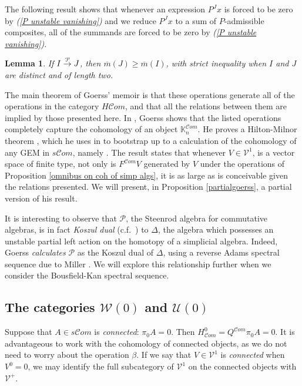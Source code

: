 \documentclass[11pt]{amsart} \renewcommand{\baselinestretch}{1.4}
\theoremstyle{plain}
\newtheorem{lem}[thm]{Lemma}
\theoremstyle{definition}
\newcommand{\scrC}{\mathscr{C}}
\newcommand{\calU}{\mathcal{U}}
\newcommand{\calP}{\mathcal{P}}
\newcommand{\calV}{\mathcal{V}}
\newcommand{\calw}{\mathcal{W}}
\newcommand{\citeBOX}[2][]{\cite[\mbox{#1}]{#2}}
\newcommand{\Palg}{{\calP}}
\newcommand{\deltaalg}{\Delta} %
\newcommand{\vect}[2]{\calV^{#1}_{#2}}
\newcommand{\HA}[1]{H#1}
\newcommand{\minDimP}{\overline{m}}
\newcommand{\produces}[3]{#3:#1\sim #2}
\renewcommand{\produces}[3]{#1\rightarrow_{#3} #2}%
\renewcommand{\produces}[3]{#1\overset{\smash{#3}}{\rightarrow} #2}%
\newcommand{\algs}{{\scrC\!\textit{om}}}
\begin{document}
\begin{Constructing cohomology operations}
The following result shows that whenever an expression $P^Jx$ is forced to be zero by \emph{(\ref{P unstable vanishing})}  and we reduce $P^Jx$ to a sum of $P$-admissible composites, all of the summands are forced to be zero by \emph{(\ref{P unstable vanishing})}.
\begin{lem}
\label{lemOnAdemChangeInMP}
If $\produces{I}{J}{\Palg}$, then $\minDimP(J) \geq \minDimP(I)$, with strict inequality when $I$ and $J$ are distinct and of length two.
\end{lem}
The main theorem of Goerss' memoir is that these operations generate all of the operations in the category $\HA{\algs}$, and that all  the relations between them  are implied by those presented here. In \cite[Chapter V]{MR1089001}, Goerss shows that the listed operations completely capture the cohomology of an object $\mathbb{K}_n^{\algs}$. He proves a Hilton-Milnor theorem \cite{GoerssHiltonMilnor.pdf}, which he uses in \citeBOX[\S11]{MR1089001} to bootstrap up to a calculation of the cohomology of any GEM in $s\algs$, namely \cite[Theorem I]{MR1089001}. The result states that whenever $V\in \vect{1}{}$,  is a  vector space of finite type, not only is 
$F^{\algs}V$
generated by $V$ under the operations of Proposition \ref{omnibus on coh of simp algs}, it is as large as is conceivable given the relations presented. We will present, in Proposition \ref{partialgoerss}, a partial version of his result.

It is  interesting to observe that $\Palg$, the Steenrod algebra for commutative algebras, is
in fact \emph{Koszul dual} (c.f.\ \cite{PriddyKoszul.pdf}) to $\deltaalg$, the algebra which possesses an unstable partial left action on the homotopy of a simplicial algebra. Indeed, Goerss \emph{calculates} $\Palg$ as the Koszul dual of $\deltaalg$, using a reverse Adams spectral sequence due to Miller \cite{MillerSullivanConjecture.pdf}. We will explore this relationship further when we consider the Bousfield-Kan spectral sequence.

\subsection{The categories $\calw(0)$ and $\calU(0)$}
Suppose that $A\in s\algs$ is \emph{connected}: $\pi_0A=0$. Then $H^0_{\algs}=Q^{\algs}\pi_0A=0$. It is advantageous to work with the cohomology of connected objects, as we do not need to worry about the operation $\beta$. If we say that $V\in \vect{1}{}$ is \emph{connected} when $V^{0}=0$, we may identify the full subcategory of $\vect{1}{}$ on the connected objects with $\vect{+}{}$.


\end{Constructing cohomology operations}
\end{document}
